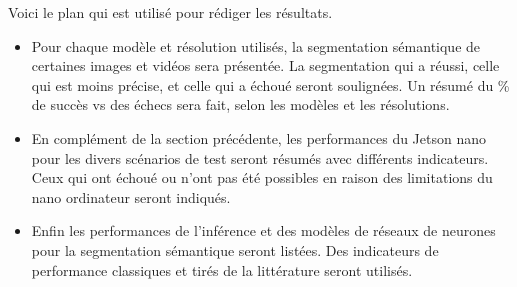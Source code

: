 ﻿{\color{red}
\par Voici le plan qui est utilisé pour rédiger les résultats.
\begin{itemize}
   \item \label{resultat1}Pour chaque modèle et résolution utilisés, la segmentation sémantique de certaines images et vidéos sera présentée. La segmentation qui a réussi, celle qui est moins précise, et celle qui a échoué seront soulignées. Un résumé du \% de succès vs des échecs sera fait, selon les modèles et les résolutions. 
   \item En complément de la section précédente, les performances du Jetson nano pour les divers scénarios de test seront résumés avec différents indicateurs. Ceux qui ont échoué ou n'ont pas été possibles en raison des limitations du nano ordinateur seront indiqués. 
   \item Enfin les performances de l'inférence et des modèles de réseaux de neurones pour la segmentation sémantique seront listées. Des indicateurs de performance classiques et tirés de la littérature seront utilisés.
\end{itemize}
}
